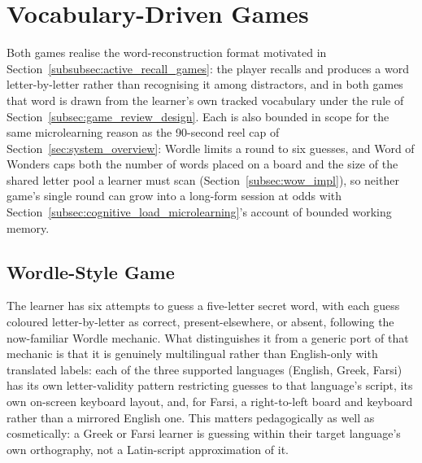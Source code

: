 \section{Vocabulary-Driven Games}
\label{sec:games_design}
    Both games realise the word-reconstruction format motivated in Section~\ref{subsubsec:active_recall_games}: the player recalls and produces a word letter-by-letter rather than recognising it among distractors, and in both games that word is drawn from the learner's own tracked vocabulary under the rule of Section~\ref{subsec:game_review_design}. Each is also bounded in scope for the same microlearning reason as the 90-second reel cap of Section~\ref{sec:system_overview}: Wordle limits a round to six guesses, and Word of Wonders caps both the number of words placed on a board and the size of the shared letter pool a learner must scan (Section~\ref{subsec:wow_impl}), so neither game's single round can grow into a long-form session at odds with Section~\ref{subsec:cognitive_load_microlearning}'s account of bounded working memory.

    \subsection{Wordle-Style Game}
    \label{subsec:wordle_design}
    The learner has six attempts to guess a five-letter secret word, with each guess coloured letter-by-letter as correct, present-elsewhere, or absent, following the now-familiar Wordle mechanic. What distinguishes it from a generic port of that mechanic is that it is genuinely multilingual rather than English-only with translated labels: each of the three supported languages (English, Greek, Farsi) has its own letter-validity pattern restricting guesses to that language's script, its own on-screen keyboard layout, and, for Farsi, a right-to-left board and keyboard rather than a mirrored English one. This matters pedagogically as well as cosmetically: a Greek or Farsi learner is guessing within their target language's own orthography, not a Latin-script approximation of it.

